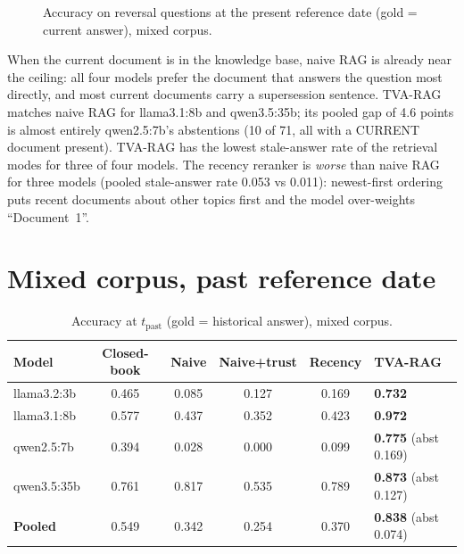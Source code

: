 \documentclass[11pt,a4paper]{report}
\begin{document}
\begin{figure}[htbp]\centering
{}
\caption{Accuracy on reversal questions at the present reference date (gold = current answer), mixed corpus.}
\end{figure}

When the current document is in the knowledge base, naive RAG is already near the ceiling: all four models prefer the document that answers the question most directly, and most current documents carry a supersession sentence. TVA-RAG matches naive RAG for llama3.1:8b and qwen3.5:35b; its pooled gap of 4.6 points is almost entirely qwen2.5:7b's abstentions (10 of 71, all with a CURRENT document present). TVA-RAG has the lowest stale-answer rate of the retrieval modes for three of four models. The recency reranker is \emph{worse} than naive RAG for three models (pooled stale-answer rate 0.053 vs 0.011): newest-first ordering puts recent documents about other topics first and the model over-weights ``Document~1''.

\section{Mixed corpus, past reference date}
\begin{table}[htbp]\centering\caption{Accuracy at $t_{\text{past}}$ (gold = historical answer), mixed corpus.}\label{tab:past}\small
\begin{tabularx}{\linewidth}{l c c c c X}\toprule\rowcolor{cIngest}\textbf{Model}&\textbf{Closed-book}&\textbf{Naive}&\textbf{Naive+trust}&\textbf{Recency}&\textbf{TVA-RAG}\\\midrule
llama3.2:3b & 0.465 & 0.085 & 0.127 & 0.169 & \textbf{0.732}\\
llama3.1:8b & 0.577 & 0.437 & 0.352 & 0.423 & \textbf{0.972}\\
qwen2.5:7b  & 0.394 & 0.028 & 0.000 & 0.099 & \textbf{0.775} (abst 0.169)\\
qwen3.5:35b & 0.761 & 0.817 & 0.535 & 0.789 & \textbf{0.873} (abst 0.127)\\\midrule
\rowcolor{cNew}\textbf{Pooled} & 0.549 & 0.342 & 0.254 & 0.370 & \textbf{0.838} (abst 0.074)\\\bottomrule\end{tabularx}\end{table}
\end{document}
